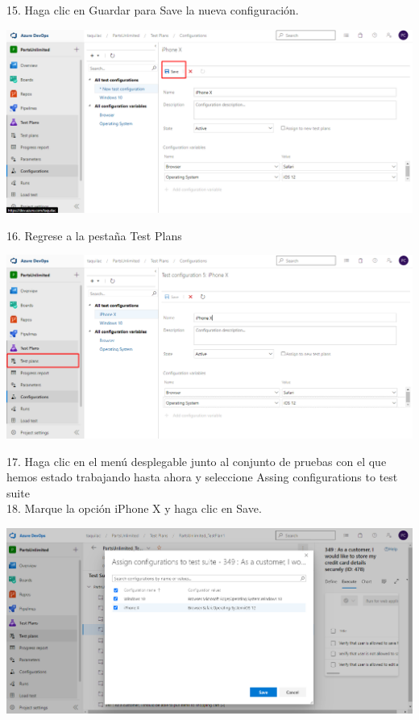 \documentclass[12pt,letterpaper]{article}
\begin{document}
15. Haga clic en Guardar para Save la nueva configuración.

\begin{center}
		\includegraphics[width=15cm]{./Imagenes/26} 
\end{center}

16. Regrese a la pestaña Test Plans

\begin{center}
		\includegraphics[width=15cm]{./Imagenes/27} 
\end{center}

17. Haga clic en el menú desplegable junto al conjunto de pruebas con el que hemos estado trabajando hasta ahora y seleccione Assing configurations to test suite\\

18. Marque la opción iPhone X y haga clic en Save.

\begin{center}
		\includegraphics[width=15cm]{./Imagenes/28} 
\end{center}
\end{document}
